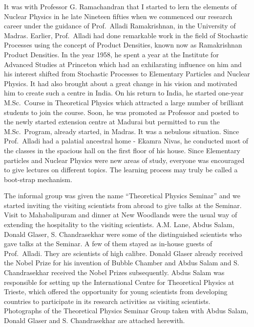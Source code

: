 It was with Professor G. Ramachandran that I started to lern the elements of Nuclear Physics in he late Nineteen fifties when we commenced our research career \cite{chap3-key1,chap3-key2,chap3-key3,chap3-key4,chap3-key5,chap3-key6,chap3-key7,chap3-key8} under the guidance of Prof.\ Alladi Ramakrishnan, in the University of Madras. Earlier, Prof.\ Alladi had done remarkable work in the field of Stochastic Processes using the concept of Product Densities, known now as Ramakrishnan Product Densities. In the year 1958, he spent a year at the Institute for Advanced Studies at Princeton which had an exhilarating influence on him and his interest shifted from Stochastic Processes to Elementary Particles and Nuclear Physics. It had also brought about a great change in his vision and motivated him to create such a centre in India. On his return to India, he started one-year M.Sc.\ Course in Theoretical Physics which attracted a large number of brilliant students to join the course. Soon, he was promoted as Professor and posted to the newly started extension centre at Madurai but permitted to run the M.Sc.\ Program, already started, in Madras. It was a nebulous situation. Since Prof.\ Alladi had a palatial ancestral home - Ekamra Nivas, he conducted most of the classes in the spacious hall on the first floor of his house. Since Elementary particles and Nuclear Physics were new areas of study, everyone was encouraged to give lectures on different topics. The learning process may truly be called a boot-strap mechanism.

The informal group was given the name “Theoretical Physics Seminar” and we started inviting the visiting scientists from abroad to give talks at the Seminar. Visit to Mahabalipuram and dinner at New Woodlands were the usual way of extending the hospitality to the visiting scientists. A.M. Lane, Abdus Salam, Donald Glaser, S. Chandrasekhar were some of the distinguished scientists who gave talks at the Seminar. A few of them stayed as in-house guests of Prof.\ Alladi. They are scientists of high calibre. Donald Glaser already received the Nobel Prize for his invention of Bubble Chamber and Abdus Salam and S. Chandrasekhar received the Nobel Prizes subsequently. Abdus Salam was responsible for setting up the International Centre for Theoretical Physics at Trieste, which offered the opportunity for young scientists from developing countries to participate in its research activities as visiting scientists. Photographs of the Theoretical Physics Seminar Group taken with Abdus Salam, Donald Glaser and S. Chandrasekhar are attached herewith.


